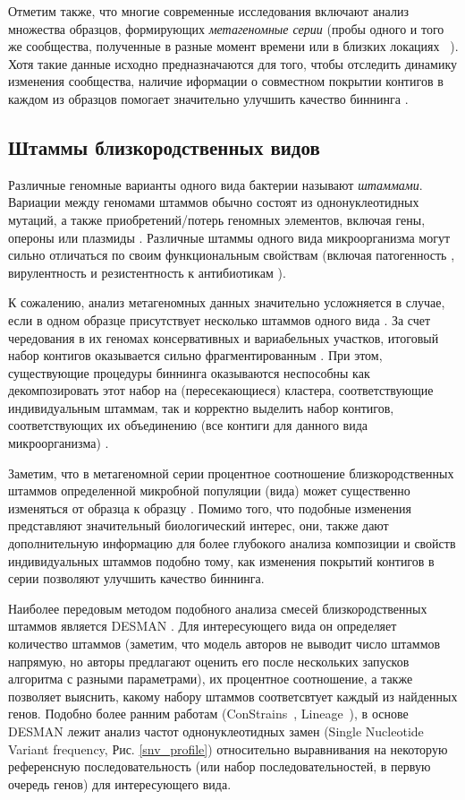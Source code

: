 \documentclass{spbau-diploma}
\begin{document}
Отметим также, что многие современные исследования включают анализ множества образцов, формирующих \textit{метагеномные серии} (пробы одного и того же сообщества, полученные в разные момент времени \cite{time_series} или в близких локациях ~\cite{spacial_series_1, spacial_series_2}). Хотя такие данные исходно предназначаются для того, чтобы отследить динамику изменения сообщества, наличие иформации о совместном покрытии контигов в каждом из образцов помогает значительно улучшить качество биннинга \cite{CONCOCT}.


\subsection{Штаммы близкородственных видов}

Различные геномные варианты одного вида бактерии называют \textit{штаммами}. Вариации между геномами штаммов обычно состоят из однонуклеотидных мутаций, а также приобретений/потерь геномных элементов, включая гены, опероны или плазмиды \cite{StrainPhlAn}. Различные штаммы одного вида микроорганизма могут сильно отличаться по своим функциональным свойствам (включая патогенность \cite{strain_level_2}, вирулентность \cite{strain_level_3} и резистентность к антибиотикам \cite{antibitics_resistance}).

К сожалению, анализ метагеномных данных значительно усложняется  в случае, если в одном образце присутствует несколько штаммов одного вида \cite{StrainEst, metasub, infant_gut}.
За счет чередования в их геномах консервативных и вариабельных участков, итоговый набор контигов оказывается сильно фрагментированным \cite{infant_gut}. 
При этом, существующие процедуры биннинга оказываются неспособны как декомпозировать этот набор на (пересекающиеся) кластера, соответствующие индивидуальным штаммам, так и корректно выделить набор контигов, соответствующих их объединению (все контиги для данного вида микроорганизма) \cite{DESMAN}.

Заметим, что в метагеномной серии процентное соотношение близкородственных штаммов определенной микробной популяции (вида) может существенно изменяться от образца к образцу \cite{infant_gut}. 
Помимо того, что подобные изменения представляют значительный биологический интерес, они, также дают дополнительную информацию для более глубокого анализа композиции и свойств индивидуальных штаммов подобно тому, как изменения покрытий контигов в серии позволяют улучшить качество биннинга.

Наиболее передовым методом подобного анализа смесей близкородственных штаммов является DESMAN \cite{DESMAN}. Для интересующего вида он определяет количество штаммов (заметим, что модель авторов не выводит число штаммов напрямую, но авторы предлагают оценить его после нескольких запусков алгоритма с разными параметрами), их процентное соотношение, а также позволяет выяснить, какому набору штаммов соответсвтует каждый из найденных генов.
Подобно более ранним работам (ConStrains~\cite{Constrains}, Lineage~\cite{Lineage}), в основе DESMAN лежит анализ частот однонуклеотидных замен (Single Nucleotide Variant frequency, Рис. \ref{snv_profile}) относительно выравнивания на некоторую референсную последовательность (или набор последовательностей, в первую очередь генов) для интересующего вида.
\end{document}
